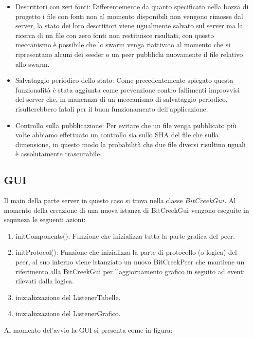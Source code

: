 \begin{itemize}
\item Descrittori con zeri fonti: Differentemente da quanto specificato nella bozza di progetto i file con fonti non al momento disponibili non vengono rimosse dal server, la stato dei loro descrittori viene ugualmente salvato sul server ma la ricerca di un file con zero fonti non restituisce risultati, con questo meccanismo \`e possibile che lo swarm venga riattivato al momento che si ripresentano alcuni dei seeder o un peer pubblichi nuovamente il file relativo allo swarm.
\item Salvataggio periodico dello stato: Come precedentemente spiegato questa funzionalit\`a \`e stata aggiunta come prevenzione contro fallimenti improvvisi del server che, in mancanza di un meccanismo di salvataggio periodico, risulterebbero fatali per il buon funzionamento dell'applicazione.
\item Controllo sulla pubblicazione: Per evitare che un file venga pubblicato pi\`u volte abbiamo effettuato un controllo sia sullo SHA del file che sulla dimensione, in questo modo la probabilit\`a che due file diversi risultino uguali \`e assolutamente trascurabile.
\end{itemize}

\subsection{GUI}

Il main della parte server in questo caso si trova nella classe $BitCreekGui$. Al momento della creazione di una nuova istanza di BitCreekGui vengono eseguite in sequneza le seguenti azioni:
\begin{enumerate}
\item initComponents(): Funzione che inizializza tutta la parte grafica del peer.
\item initProtocol(): Funzione che inizializza la parte di protocollo (o logica) del peer, al suo interno viene istanziato un nuovo BitCreekPeer che mantiene un riferimento alla BitCreekGui per l'aggiornamento grafico in seguito ad eventi rilevati dalla logica.
\item inizializzazione del ListenerTabelle.
\item inizializzazione del ListenerGrafico.
\end{enumerate}

Al momento del'avvio la GUI si presenta come in figura:

